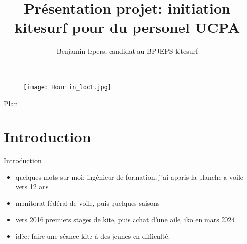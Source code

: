 \documentclass[10pt,a4paper]{beamer}
\author{Benjamin lepers, candidat au BPJEPS kitesurf}
\begin{document}
\title{Présentation projet: initiation kitesurf pour du personel UCPA}
\begin{frame}
\titlepage
\begin{figure}
\texttt{[image: Hourtin\_loc1.jpg]} 
\end{figure}
\end{frame}

\begin{frame}{Plan}
\tableofcontents
\end{frame}



% 

\section{Introduction}
\begin{frame}{Introduction}
\begin{itemize}
\item quelques mots sur moi: ingénieur de formation, j'ai appris la planche à voile vers 12 ans
\item monitorat fédéral de voile, puis quelques saisons
\item vers 2016 premiers stages de kite, puis achat d'une aile, iko en mars 2024
\item idée: faire une séance kite à des jeunes en difficulté.
\end{itemize}
\end{frame}
\end{document}
